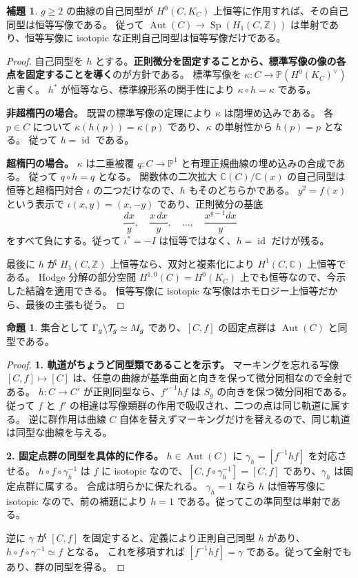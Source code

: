 \documentclass[dvipdfmx,a4paper,11pt]{article}
\theoremstyle{definition}
\newtheorem{prop}[thm]{命題}
\newtheorem{lem}[thm]{補題}
\newcommand{\C}{\mathbb C}\newcommand{\R}{\mathbb R}\newcommand{\Z}{\mathbb Z}\newcommand{\Q}{\mathbb Q}
\newcommand{\PP}{\mathbb P}\newcommand{\HH}{\mathbb H}
\DeclareMathOperator{\Aut}{Aut}\DeclareMathOperator{\Pic}{Pic}\DeclareMathOperator{\Hom}{Hom}
\DeclareMathOperator{\Sp}{Sp}\DeclareMathOperator{\Sym}{Sym}\DeclareMathOperator{\Ext}{Ext}
\newcommand{\id}{\operatorname{id}}
\begin{document}
\begin{lem}\label{lem:autfaithful}
$g\ge2$ の曲線の自己同型が $H^0(C,K_C)$ 上恒等に作用すれば、その自己同型は恒等写像である。
従って $\Aut(C)\to\Sp(H_1(C,\Z))$ は単射であり、恒等写像に isotopic な正則自己同型は恒等写像だけである。
\end{lem}
\begin{proof}
自己同型を $h$ とする。\textbf{正則微分を固定することから、標準写像の像の各点を固定することを導く}のが方針である。
標準写像を $\kappa:C\to\PP(H^0(K_C)^\vee)$ と書く。
$h^*$ が恒等なら、標準線形系の関手性により $\kappa\circ h=\kappa$ である。

\textbf{非超楕円の場合。} 既習の標準写像の定理により $\kappa$ は閉埋め込みである。
各 $p\in C$ について $\kappa(h(p))=\kappa(p)$ であり、$\kappa$ の単射性から $h(p)=p$ となる。
従って $h=\id$ である。

\textbf{超楕円の場合。} $\kappa$ は二重被覆 $q:C\to\PP^1$ と有理正規曲線の埋め込みの合成である。
従って $q\circ h=q$ となる。
関数体の二次拡大 $\C(C)/\C(x)$ の自己同型は恒等と超楕円対合 $\iota$ の二つだけなので、$h$ もそのどちらかである。
$y^2=f(x)$ という表示で $\iota(x,y)=(x,-y)$ であり、正則微分の基底
\[
\frac{dx}{y},\quad\frac{x\,dx}{y},\quad\ldots,\quad\frac{x^{g-1}dx}{y}
\]
をすべて負にする。従って $\iota^*=-I$ は恒等ではなく、$h=\id$ だけが残る。

最後に $h$ が $H_1(C,\Z)$ 上恒等なら、双対と複素化により $H^1(C,\C)$ 上恒等である。
Hodge 分解の部分空間 $H^{1,0}(C)=H^0(K_C)$ 上でも恒等なので、今示した結論を適用できる。
恒等写像に isotopic な写像はホモロジー上恒等だから、最後の主張も従う。
\end{proof}
\begin{prop}\label{prop:teichquotient}
集合として $\Gamma_g\backslash\mathcal T_g\simeq M_g$ であり、$[C,f]$ の固定点群は $\Aut(C)$ と同型である。
\end{prop}
\begin{proof}
\textbf{1. 軌道がちょうど同型類であることを示す。}
マーキングを忘れる写像 $[C,f]\mapsto[C]$ は、任意の曲線が基準曲面と向きを保って微分同相なので全射である。
$h:C\to C'$ が正則同型なら、$f'^{-1}hf$ は $S_g$ の向きを保つ微分同相である。
従って $f$ と $f'$ の相違は写像類群の作用で吸収され、二つの点は同じ軌道に属する。
逆に群作用は曲線 $C$ 自体を替えずマーキングだけを替えるので、同じ軌道は同型な曲線を与える。

\textbf{2. 固定点群の同型を具体的に作る。}
$h\in\Aut(C)$ に $\gamma_h=[f^{-1}hf]$ を対応させる。
$h\circ f\circ\gamma_h^{-1}$ は $f$ に isotopic なので、$[C,f\circ\gamma_h^{-1}]=[C,f]$ であり、$\gamma_h$ は固定点群に属する。
合成は明らかに保たれる。
$\gamma_h=1$ なら $h$ は恒等写像に isotopic なので、前の補題により $h=1$ である。従ってこの準同型は単射である。

逆に $\gamma$ が $[C,f]$ を固定すると、定義により正則自己同型 $h$ があり、
$h\circ f\circ\gamma^{-1}\simeq f$ となる。
これを移項すれば $[f^{-1}hf]=\gamma$ である。従って全射でもあり、群の同型を得る。
\end{proof}
\end{document}
